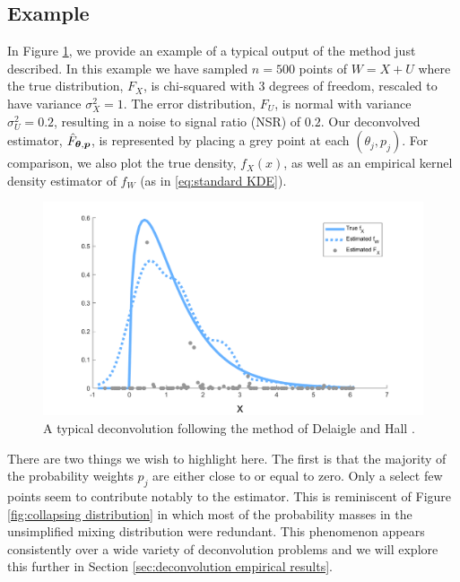 	\subsection{Example}
	In Figure \ref{fig:fixed masses example no smoothing}, we provide an example of a typical output of the method just described. In this example we have sampled $n = 500$ points of $W = X+U$ where the true distribution, $F_X$, is chi-squared with 3 degrees of freedom, rescaled to have variance $\sigma_X^2 = 1$. The error distribution, $F_U$, is normal with variance $\sigma_U^2 = 0.2$, resulting in a noise to signal ratio (NSR) of $0.2$. Our deconvolved estimator, $\hat{F}_{{\bm{{\theta}}}, {\bm{{p}}}}$, is represented by placing a grey point at each $(\theta_j, p_j)$. For comparison, we also plot the true density, $f_X(x)$, as well as an empirical kernel density estimator of $f_W$ (as in \eqref{eq:standard KDE}).

	\begin{figure}[ht]
		\centering
		\includegraphics[width = \textwidth]{Figures/Deconvolution/fixed_masses_example_nosmoothing.png}
		\caption{A typical deconvolution following the method of Delaigle and Hall \cite{Delaigle2016-la}.}
		\label{fig:fixed masses example no smoothing}
	\end{figure}

	There are two things we wish to highlight here. The first is that the majority of the probability weights $p_j$ are either close to or equal to zero. Only a select few points seem to contribute notably to the estimator. This is reminiscent of Figure \ref{fig:collapsing distribution} in which most of the probability masses in the unsimplified mixing distribution were redundant. This phenomenon appears consistently over a wide variety of deconvolution problems and we will explore this further in Section \ref{sec:deconvolution empirical results}. 

